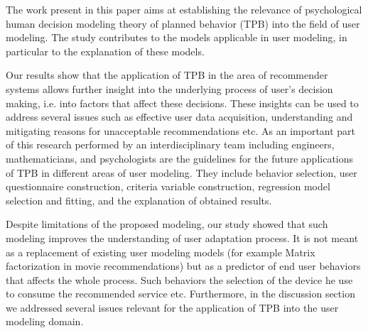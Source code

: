 \documentclass{llncs}
\begin{document}
The work present in this paper aims at establishing the relevance of psychological human decision modeling theory of planned behavior (TPB) into the field of user modeling. The study contributes to the models applicable in user modeling, in particular to the explanation of these models. 

Our results show that the application of TPB in the area of recommender systems allows further insight into the underlying process of user's decision making, i.e. into factors that affect these decisions. These insights can be used to address several issues such as effective user data acquisition, understanding and mitigating reasons for unacceptable recommendations etc. As an important part of this research performed by an interdisciplinary team including engineers, mathematicians, and psychologists are the guidelines for the future applications of TPB in different areas of user modeling. They include behavior selection, user questionnaire construction, criteria variable construction, regression model selection and fitting, and the explanation of obtained results. 

Despite limitations of the proposed modeling, our study showed that such modeling improves the understanding of user adaptation process. It is not meant as a replacement of existing user modeling models (for example Matrix factorization in movie recommendations) but as a predictor of end user behaviors that affects the whole process. Such behaviors the selection of the device he use to consume the recommended service etc. Furthermore, in the discussion section we addressed several issues relevant for the application of TPB into the user modeling domain. 


% 
% 
% 







\end{document}
